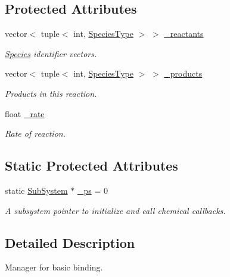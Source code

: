 \subsection*{Protected Attributes}
\begin{DoxyCompactItemize}
\item 
vector$<$ tuple$<$ int, \hyperlink{Species_8h_a50651af47c56ea0e27235468d23542cf}{Species\+Type} $>$ $>$ \hyperlink{classInternalFilamentRxnManager_a63de9061c3da4ad03cf4c530d2774979}{\+\_\+reactants}
\begin{DoxyCompactList}\small\item\em \hyperlink{classSpecies}{Species} identifier vectors. \end{DoxyCompactList}\item 
vector$<$ tuple$<$ int, \hyperlink{Species_8h_a50651af47c56ea0e27235468d23542cf}{Species\+Type} $>$ $>$ \hyperlink{classInternalFilamentRxnManager_afd213da1a3706e2e88962e5da886a5dc}{\+\_\+products}
\begin{DoxyCompactList}\small\item\em Products in this reaction. \end{DoxyCompactList}\item 
float \hyperlink{classInternalFilamentRxnManager_a8b98dd9e6f5d016149f5434b891806df}{\+\_\+rate}
\begin{DoxyCompactList}\small\item\em Rate of reaction. \end{DoxyCompactList}\end{DoxyCompactItemize}
\subsection*{Static Protected Attributes}
\begin{DoxyCompactItemize}
\item 
static \hyperlink{classSubSystem}{Sub\+System} $\ast$ \hyperlink{classInternalFilamentRxnManager_a973ce9cc2aae811e6867afa46193c5f2}{\+\_\+ps} = 0
\begin{DoxyCompactList}\small\item\em A subsystem pointer to initialize and call chemical callbacks. \end{DoxyCompactList}\end{DoxyCompactItemize}


\subsection{Detailed Description}
Manager for basic binding. 

